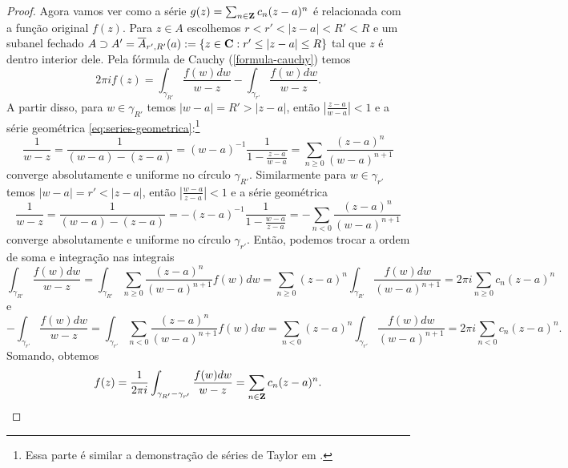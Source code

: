 \begin{proof}
Agora vamos ver como a série $g(z) = \sum_{n\in\mathbf{Z}} c_n (z-a)^n$ é relacionada com a função original $f(z)$.
Para $z\in A$ escolhemos $r<r'<|z-a|<R'<R$ e um subanel fechado
$A \supset A'= \overline{A}_{r',R'}(a) := \{ z\in\mathbf{C} : r'\leq|z-a|\leq R\}$
tal que $z$ é dentro interior dele.
Pela fórmula de Cauchy (\cref{formula-cauchy}) temos
\[ 2\pi i f(z) = \int_{\gamma_{R'}} \frac{f(w)dw}{w-z} - \int_{\gamma_{r'}} \frac{f(w)dw}{w-z}. \]
A partir disso, para $w\in\gamma_{R'}$
temos $|w-a| = R' > |z-a|$, então $|\frac{z-a}{w-a}|<1$
e a série geométrica \eqref{eq:series-geometrica}:\footnote{
Essa parte é similar a demonstração de séries de Taylor em .}
\begin{equation*}
 \frac{1}{w-z} = \frac{1}{(w-a)-(z-a)} = (w-a)^{-1} \frac1{1-\frac{z-a}{w-a}}
= \sum_{n\geq 0} \frac{(z-a)^n}{(w-a)^{n+1}}
\end{equation*}
converge absolutamente e uniforme no círculo $\gamma_{R'}$.
Similarmente para $w\in\gamma_{r'}$
temos $|w-a| = r' < |z-a|$, então $|\frac{w-a}{z-a}|<1$
e a série geométrica 
\begin{equation*}
 \frac{1}{w-z} = \frac{1}{(w-a)-(z-a)} = -(z-a)^{-1} \frac1{1-\frac{w-a}{z-a}}
= - \sum_{n<0} \frac{(z-a)^n}{(w-a)^{n+1}}
\end{equation*}
converge absolutamente e uniforme no círculo $\gamma_{r'}$.
Então, podemos trocar a ordem de soma e integração nas integrais
\[ \int_{\gamma_{R'}} \frac{f(w)dw}{w-z}
  = \int_{\gamma_{R'}} \sum_{n\geq 0} \frac{(z-a)^n}{(w-a)^{n+1}} f(w) dw
  = \sum_{n\geq 0} (z-a)^n \int_{\gamma_{R'}} \frac{f(w)dw}{(w-a)^{n+1}}
  = 2\pi i \sum_{n\geq 0} c_n (z-a)^n \]
e
\[ -\int_{\gamma_{r'}} \frac{f(w)dw}{w-z}
  = \int_{\gamma_{r'}} \sum_{n<0} \frac{(z-a)^n}{(w-a)^{n+1}} f(w) dw
  = \sum_{n<0} (z-a)^n \int_{\gamma_{r'}} \frac{f(w)dw}{(w-a)^{n+1}}
  = 2\pi i \sum_{n<0} c_n (z-a)^n. \]
Somando, obtemos
\[ f(z) = \frac{1}{2\pi i} \int_{\gamma_{R'}-\gamma_{r'}} \frac{f(w)dw}{w-z} 
        = \sum_{n\in\mathbf{Z}} c_n (z-a)^n. \]
\end{proof}

